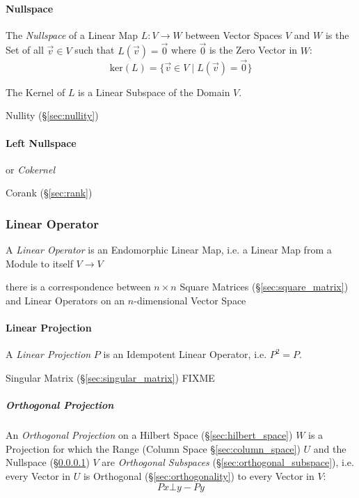 \paragraph{Nullspace}\label{sec:nullspace}\hfill

The \emph{Nullspace} of a Linear Map $L : V \rightarrow W$ between Vector
Spaces $V$ and $W$ is the Set of all $\vec{v}\in{V}$ such that $L(\vec{v}) =
\vec{0}$ where $\vec{0}$ is the Zero Vector in $W$:
\[
  \text{ker}(L) = \{\vec{v}\in{V} \;|\; L(\vec{v}) = \vec{0}\}
\]

The Kernel of $L$ is a Linear Subspace of the Domain $V$.

Nullity (\S\ref{sec:nullity})



\paragraph{Left Nullspace}\label{sec:left_nullspace}\hfill

or \emph{Cokernel}

Corank (\S\ref{sec:rank})



\subsubsection{Linear Operator}\label{sec:linear_operator}

A \emph{Linear Operator} is an Endomorphic Linear Map, i.e. a Linear
Map from a Module to itself $V \rightarrow V$

there is a correspondence between $n\times{n}$ Square Matrices
(\S\ref{sec:square_matrix}) and Linear Operators on an $n$-dimensional Vector
Space



\paragraph{Linear Projection}\label{sec:projection}\hfill

A \emph{Linear Projection} $P$ is an Idempotent Linear Operator, i.e. $P^2 = P$.

Singular Matrix (\S\ref{sec:singular_matrix}) FIXME



\subparagraph{Orthogonal Projection}\label{sec:orthogonal_projection}\hfill

An \emph{Orthogonal Projection} on a Hilbert Space (\S\ref{sec:hilbert_space})
$W$ is a Projection for which the Range (Column Space \S\ref{sec:column_space})
$U$ and the Nullspace (\S\ref{sec:nullspace}) $V$ are \emph{Orthogonal
  Subspaces} (\S\ref{sec:orthogonal_subspace}), i.e. every Vector in $U$ is
Orthogonal (\S\ref{sec:orthogonality}) to every Vector in $V$:
\[
  Px \bot y - Py
\]

